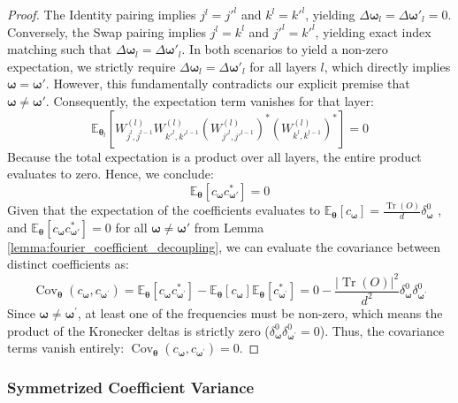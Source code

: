 \documentclass[%
 reprint,
 amsmath,amssymb,
 aps,
 pra,
]{revtex4-2}
\theoremstyle{definition}
\begin{document}
\begin{proof}
The Identity pairing implies $j^l=j'^l$ and $k^l=k'^l$, yielding $\Delta\bm{\omega}_l = \Delta\bm{\omega}'_l = 0$. Conversely, the Swap pairing implies $j^l=k^l$ and $j'^l=k'^l$, yielding exact index matching such that $\Delta \bm{\omega}_l = \Delta \bm{\omega}'_l$. In both scenarios to yield a non-zero expectation, we strictly require $\Delta \bm{\omega}_l = \Delta \bm{\omega}'_l$ for all layers $l$, which directly implies $\bm{\omega} = \bm{\omega}'$. However, this fundamentally contradicts our explicit premise that $\bm{\omega} \neq \bm{\omega}'$. Consequently, the expectation term vanishes for that layer:
$$
\mathbb{E}_{\bm{\theta}_l} \left[ W^{(l)}_{j^l, j^{l-1}} W^{(l)}_{k'^l, k'^{l-1}} \left( W^{(l)}_{j'^l, j'^{l-1}} \right)^* \left( W^{(l)}_{k^l, k^{l-1}} \right)^* \right] = 0
$$
Because the total expectation is a product over all layers, the entire product evaluates to zero. Hence, we conclude:
$$
\mathbb{E}_{\bm{\theta}} [c_{\bm{\omega}} c_{\bm{\omega}'}^*] = 0
$$
Given that the expectation of the coefficients evaluates to $\mathbb{E}_{\bm{\theta}}\left[c_{\bm{\omega}}\right]=\frac{\operatorname{Tr}(O)}{d} \delta_{\bm{\omega}}^0$ \cite{Hela2025}, and $\mathbb{E}_{\bm{\theta}} [c_{\bm{\omega}} c_{\bm{\omega}'}^*] = 0$ for all $\bm{\omega}\neq \bm{\omega'}$ from Lemma \ref{lemma:fourier_coefficient_decoupling}, we can evaluate the covariance between distinct coefficients as:
$$
\operatorname{Cov}_{\bm{\theta}}\left(c_{\bm{\omega}}, c_{\bm{\omega}^{\prime}}\right)=\mathbb{E}_{\bm{\theta}}\left[c_{\bm{\omega}} c_{\bm{\omega}^{\prime}}^*\right]-\mathbb{E}_{\bm{\theta}}\left[c_{\bm{\omega}}\right] \mathbb{E}_{\bm{\theta}}\left[c_{\bm{\omega}^{\prime}}^*\right]= 0 - \frac{|\operatorname{Tr}(O)|^2}{d^2} \delta_{\bm{\omega}}^0 \delta_{\bm{\omega}^{\prime}}^0
$$
Since $\bm{\omega} \neq \bm{\omega}^{\prime}$, at least one of the frequencies must be non-zero, which means the product of the Kronecker deltas is strictly zero ($\delta_{\bm{\omega}}^0 \delta_{\bm{\omega}^{\prime}}^0 = 0$). Thus, the covariance terms vanish entirely: $\operatorname{Cov}_{\bm{\theta}}\left(c_{\bm{\omega}}, c_{\bm{\omega}^{\prime}}\right) = 0$.

\end{proof}

\subsubsection{Symmetrized Coefficient Variance}
\label{app:symmetrized_coefficient_variance}
\end{document}
